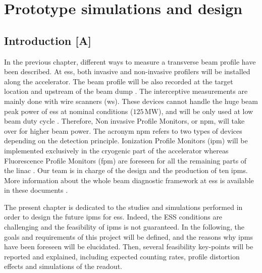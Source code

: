\chapter{Prototype simulations and design}
\cleardoublepage
\minitoc
\section{Introduction [A]}
\begin{refsection}
  \label{ch3:Introduction}
  In the previous chapter, different ways to measure a transverse beam profile have been described. At \acrshort{ess}, both invasive and non-invasive profilers will be installed along the accelerator. The beam profile will be also recorded at the target location and upstream of the beam dump \cite{shea2013}. The interceptive measurements are mainly done with wire scanners (\acrshort{ws}). These devices cannot handle the huge beam peak power of \acrshort{ess} at nominal conditions ($125\,\mathrm{MW}$), and will be only used at low beam duty cycle \cite{Cheymol2013}. Therefore, Non invasive Profile Monitors, or \acrshort{npm}, will take over for higher beam power. The acronym \acrshort{npm} refers to two types of devices depending on the detection principle. Ionization Profile Monitors (\acrshort{ipm}) will be implemented exclusively in the cryogenic part of the accelerator whereas Fluorescence Profile Monitors (\acrshort{fpm}) are foreseen for all the remaining parts of the linac \cite{Thomas2016}. Our team is in charge of the design and the production of ten \acrshort{ipm}s. More information about the whole beam diagnostic framework at \acrshort{ess} is available in these documents \cite{Peggs2013,Shea:IBIC2017-MO2AB2}.

  The present chapter is dedicated to the studies and simulations performed in order to design the future \acrshort{ipm}s for \acrshort{ess}. Indeed, the ESS conditions are challenging and the feasibility of \acrshort{ipm}s is not guaranteed. In the following, the goals and requirements of this project will be defined, and the reasons why \acrshort{ipm}s have been foreseen will be elucidated. Then, several feasibility key-points will be reported and explained, including expected counting rates, profile distortion effects and simulations of the readout.


\end{refsection}
